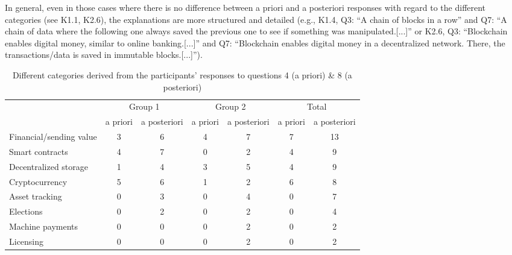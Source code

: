 In general, even in those cases where there is no difference between a priori and a posteriori responses with regard to the different categories (see K1.1, K2.6), the explanations are more structured and detailed (e.g., K1.4, Q3: \enquote{A chain of blocks in a row} and Q7: \enquote{A chain of data where the following one always saved the previous one to see if something was manipulated.[...]} or K2.6, Q3: \enquote{Blockchain enables digital money, similar to online banking.[...]} and Q7: \enquote{Blockchain enables digital money in a decentralized network. There, the transactions/data is saved in immutable blocks.[...]}).

\setlength\dashlinedash{0.2pt}
\setlength\dashlinegap{1.5pt}
\setlength\arrayrulewidth{0.3pt}

\begin{table}[]
    \centering
    \begin{tabular}{l|cc|cc|cc}
          & \multicolumn{2}{c}{Group 1} & \multicolumn{2}{c}{Group 2} & \multicolumn{2}{c}{Total} \\
          & a priori   & a posteriori  & a priori   & a posteriori   & a priori  & a posteriori  \\
        \hline
Financial/sending value &   3         &        6       &     4       &      7          &    7       &       13      \\
Smart contracts          &   4         &        7       &     0       &        2        &     4      &       9      \\
Decentralized storage   &     1       &        4       &      3      &         5       &     4      &      9        \\
Cryptocurrency          &   5         &       6        &      1      &       2         &     6      &      8        \\
\hdashline
Asset tracking          &     0       &       3        &     0       &       4         &     0      &       7       \\
Elections               &     0       &       2        &     0       &       2         &     0      &      4        \\
Machine payments        &     0       &       0        &     0       &       2         &     0      &      2        \\
Licensing               &     0       &       0        &     0       &       2         &     0      &       2       \\
\end{tabular}
    \caption{Different categories derived from the participants' responses to questions 4 (a priori) \& 8 (a posteriori)}
    \label{tab:results48}
\end{table}

